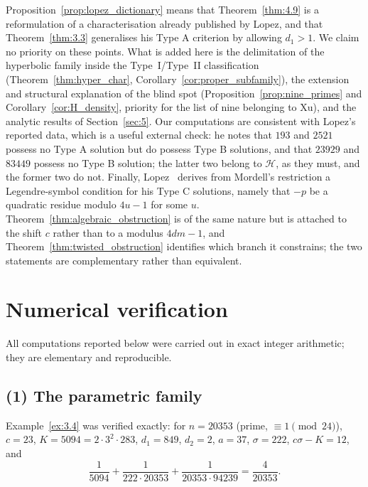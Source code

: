 \documentclass[11pt, a4paper]{article}
\theoremstyle{plain}
\theoremstyle{definition}
\begin{document}
Proposition~\ref{prop:lopez_dictionary} means that Theorem~\ref{thm:4.9} is a reformulation of a characterisation already published by Lopez, and that Theorem~\ref{thm:3.3} generalises his Type A criterion by allowing $d_1>1$. We claim no priority on these points. What is added here is the delimitation of the hyperbolic family inside the Type~I/Type~II classification (Theorem~\ref{thm:hyper_char}, Corollary~\ref{cor:proper_subfamily}), the extension and structural explanation of the blind spot (Proposition~\ref{prop:nine_primes} and Corollary~\ref{cor:H_density}, priority for the list of nine belonging to Xu), and the analytic results of Section~\ref{sec:5}. Our computations are consistent with Lopez's reported data, which is a useful external check: he notes that $193$ and $2521$ possess no Type A solution but do possess Type B solutions, and that $23929$ and $83449$ possess no Type B solution; the latter two belong to $\mathcal{H}$, as they must, and the former two do not. Finally, Lopez~\cite[Cor.~3]{lopez2024} derives from Mordell's restriction a Legendre-symbol condition for his Type C solutions, namely that $-p$ be a quadratic residue modulo $4u-1$ for some $u$. Theorem~\ref{thm:algebraic_obstruction} is of the same nature but is attached to the shift $c$ rather than to a modulus $4dm-1$, and Theorem~\ref{thm:twisted_obstruction} identifies which branch it constrains; the two statements are complementary rather than equivalent.

\section{Numerical verification} \label{sec:7}

All computations reported below were carried out in exact integer arithmetic; they are elementary and reproducible.

\subsection*{(1) The parametric family}
Example~\ref{ex:3.4} was verified exactly: for $n=20353$ (prime, $\equiv1\pmod{24}$), $c=23$, $K=5094=2\cdot3^{2}\cdot283$, $d_1=849$, $d_2=2$, $a=37$, $\sigma=222$, $c\sigma-K=12$, and
$$ \frac{1}{5094}+\frac{1}{222\cdot20353}+\frac{1}{20353\cdot94239}=\frac{4}{20353}.$$
\end{document}
